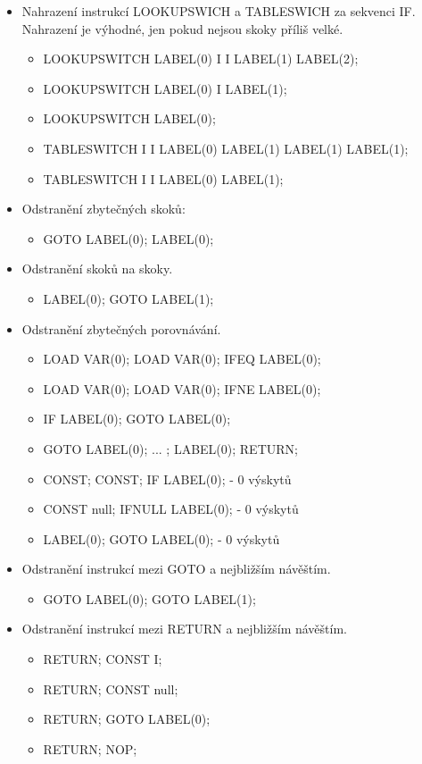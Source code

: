 \begin{itemize}
\item Nahrazení instrukcí LOOKUPSWICH a TABLESWICH za sekvenci IF. Nahrazení je výhodné, jen pokud nejsou skoky příliš velké.
\begin{itemize}
\item LOOKUPSWITCH LABEL(0) I I LABEL(1) LABEL(2); 
\item LOOKUPSWITCH LABEL(0) I LABEL(1); 
\item LOOKUPSWITCH LABEL(0); 
\item TABLESWITCH I I LABEL(0) LABEL(1) LABEL(1) LABEL(1); 
\item TABLESWITCH I I LABEL(0) LABEL(1); 
\end{itemize}

\item Odstranění zbytečných skoků:
\begin{itemize}
\item GOTO LABEL(0); LABEL(0); 
\end{itemize}

\item Odstranění skoků na skoky.
\begin{itemize}
\item LABEL(0); GOTO LABEL(1);
\end{itemize}

\item Odstranění zbytečných porovnávání.
\begin{itemize}
\item LOAD VAR(0); LOAD VAR(0); IFEQ LABEL(0);
\item LOAD VAR(0); LOAD VAR(0); IFNE LABEL(0);
\item IF LABEL(0); GOTO LABEL(0);
\item GOTO LABEL(0); ... ; LABEL(0); RETURN;
\item CONST; CONST; IF LABEL(0); - 0 výskytů
\item CONST null; IFNULL LABEL(0); - 0 výskytů
\item LABEL(0); GOTO LABEL(0);  - 0 výskytů
\end{itemize}

\item Odstranění instrukcí mezi GOTO a nejbližším návěštím.
\begin{itemize}
\item GOTO LABEL(0); GOTO LABEL(1);
\end{itemize}

\item Odstranění instrukcí mezi RETURN a nejbližším návěštím.
\begin{itemize}
\item RETURN; CONST I;
\item RETURN; CONST null;
\item RETURN; GOTO LABEL(0);
\item RETURN; NOP;
\end{itemize}

\end{itemize}

